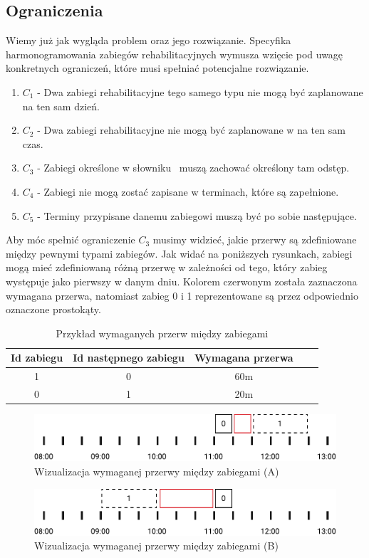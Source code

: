 \subsection{Ograniczenia}
\label{constraints}
Wiemy już jak wygląda problem oraz jego rozwiązanie. Specyfika
harmonogramowania zabiegów rehabilitacyjnych wymusza wzięcie pod uwagę
konkretnych ograniczeń, które musi spełniać potencjalne rozwiązanie.
\begin{enumerate}
	\item{$C_1$ - Dwa zabiegi rehabilitacyjne tego samego typu nie mogą być
		zaplanowane na ten sam dzień.}
	\item{$C_2$ - Dwa zabiegi rehabilitacyjne nie mogą być zaplanowane w na ten sam czas.}
	\item{$C_3$ - Zabiegi określone w słowniku \sGap\ muszą zachować określony tam odstęp.}
	\item{$C_4$ - Zabiegi nie mogą zostać zapisane w terminach, które są zapełnione.}
	\item{$C_5$ - Terminy przypisane danemu zabiegowi muszą być po sobie
		następujące.}
\end{enumerate}
Aby móc spełnić ograniczenie $C_3$ musimy widzieć, jakie przerwy są zdefiniowane
między pewnymi typami zabiegów. Jak widać na poniższych rysunkach, zabiegi mogą
mieć zdefiniowaną różną przerwę w zależności od tego, który zabieg występuje
jako pierwszy w danym dniu. Kolorem czerwonym została zaznaczona wymagana
przerwa, natomiast zabieg 0 i 1 reprezentowane są przez odpowiednio oznaczone
prostokąty.
\begin{table}[h]
	\centering
	\begin{tabular}{ | c | c | c | c | c | }
		\hline
		\bfseries Id zabiegu & \bfseries Id następnego zabiegu & \bfseries Wymagana przerwa \\
		\hline
		1 & 0 & 60m \\
		\hline
		0 & 1 & 20m \\
		\hline
	\end{tabular}
	\caption{Przykład wymaganych przerw między zabiegami}
	\label{example-gaps}
\end{table}
\begin{figure}[h]
	\centering
	\includegraphics[width=\textwidth]{gfx/gap_1.pdf}
	\caption{Wizualizacja wymaganej przerwy między zabiegami (A)}
	\label{example-gaps-1}
\end{figure}
\begin{figure}[h]
	\centering
	\includegraphics[width=\textwidth]{gfx/gap_2.pdf}
	\caption{Wizualizacja wymaganej przerwy między zabiegami (B)}
	\label{example-gaps-2}
\end{figure}
\newpage

